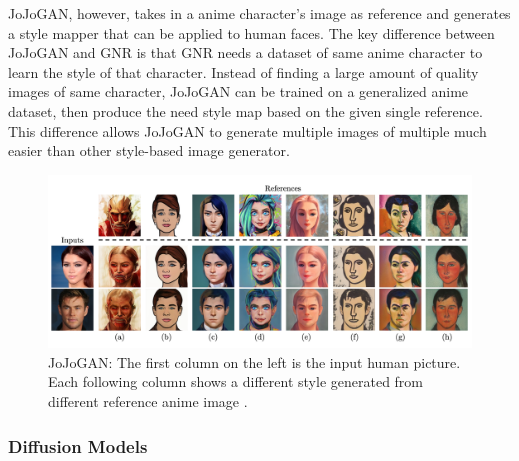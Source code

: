 JoJoGAN, however, takes in a anime character's image as reference and generates
a style mapper that can be applied to human faces.
The key difference between JoJoGAN and GNR is that GNR needs a dataset of same anime character to learn the style of that character.
Instead of finding a large amount of quality images of same character,
JoJoGAN can be trained on a generalized anime dataset,
then produce the need style map based on the given single reference.
This difference allows JoJoGAN to generate multiple images of multiple much easier than other style-based image generator.
\begin{figure}[h]
    \includegraphics[width=\textwidth]{img/JoJo-1.png}
    \caption{
        JoJoGAN: The first column on the left is the input human picture.
        Each following column shows a different style generated from different reference anime image \cite{chong2021jojogan}.
    }
\end{figure}

\subsubsection*{Diffusion Models}
